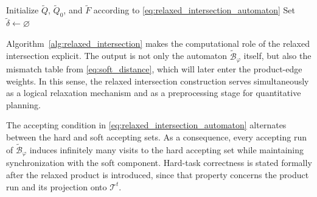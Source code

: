 \begin{algorithm}[t]
\caption{Construction of the relaxed intersection automaton}
\label{alg:relaxed_intersection}
\DontPrintSemicolon
{}
Initialize $\widetilde{Q}$, $\widetilde{Q}_{0}$, and $\widetilde{F}$ according
to \eqref{eq:relaxed_intersection_automaton}\;
Set $\widetilde{\delta} \leftarrow \varnothing$\;
\;
\end{algorithm}

Algorithm~\ref{alg:relaxed_intersection} makes the computational role of the
relaxed intersection explicit. The output is not only the automaton
$\widetilde{\mathcal{B}}_{\varphi}$ itself, but also the mismatch table from
\eqref{eq:soft_distance}, which will later enter the product-edge weights. In
this sense, the relaxed intersection construction serves simultaneously as a
logical relaxation mechanism and as a preprocessing stage for quantitative
planning.

The accepting condition in
\eqref{eq:relaxed_intersection_automaton} alternates between the hard and soft
accepting sets. As a consequence, every accepting run of
$\widetilde{\mathcal{B}}_{\varphi}$ induces infinitely many visits to the hard
accepting set while maintaining synchronization with the soft component.
Hard-task correctness is stated formally after the relaxed product is
introduced, since that property concerns the product run and its projection onto
$\mathcal{T}^{t}$.

